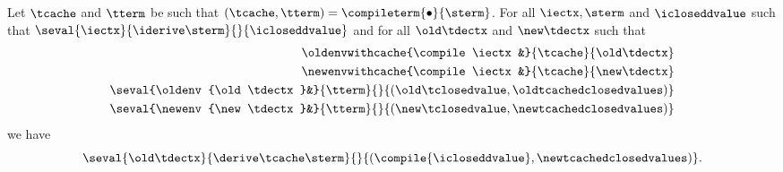 \begin{theorem}
  \label{thm:soundness-compiled-changesfinal}
  Let $\tcache$ and $\tterm$ be such that 
  $(\tcache, \tterm) = \compileterm{\bullet}{\sterm}$.
  For all $\iectx, \sterm$ and $\icloseddvalue$ such that
  $\seval{\iectx}{\iderive\sterm}{}{\icloseddvalue}$ and
  for all $\old\tdectx$ and $\new\tdectx$ such that
  \begin{align*}
  \oldenvwithcache{\compile\iectx&}{\tcache}{\old\tdectx}\\
  \newenvwithcache{\compile\iectx&}{\tcache}{\new\tdectx}\\
  \seval{\oldenv{\old\tdectx}&}{\tterm}{}{(\old\tclosedvalue, \oldtcachedclosedvalues)}\\
  \seval{\newenv{\new\tdectx}&}{\tterm}{}{(\new\tclosedvalue, \newtcachedclosedvalues)}
  \end{align*}
  we have
  \[
  \seval{\old\tdectx}{\derive\tcache\sterm}{}{(\compile{\icloseddvalue}, \newtcachedclosedvalues)}
  .\]
\end{theorem}
